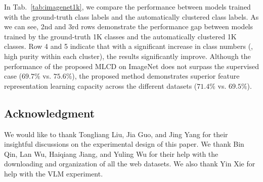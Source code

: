 In Tab.~\ref{tab:imagenet1k}, we compare the performance between models trained with the ground-truth class labels and the automatically clustered class labels. As we can see,
2nd and 3rd rows demonstrate the performance gap between models trained by the ground-truth 1K classes and the automatically clustered 1K classes. Row 4 and 5 indicate that with a significant increase in class numbers (\eg, high purity within each cluster), the results significantly improve. Although the performance of the proposed MLCD on ImageNet does not surpass the supervised case ($69.7\%$ vs. $75.6\%$), the proposed method demonstrates superior feature representation learning capacity across the different datasets ($71.4\%$ vs. $69.5\%$).

\subsection{Acknowledgment}

We would like to thank Tongliang Liu, Jia Guo, and Jing Yang for their insightful discussions on the experimental design of this paper. We thank Bin Qin, Lan Wu, Haiqiang Jiang, and Yuling Wu for their help with the downloading and organization of all the web datasets. We also thank Yin Xie for help with the VLM experiment.

